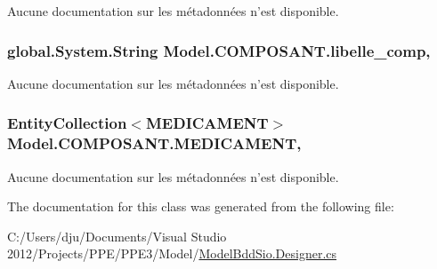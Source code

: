 Aucune documentation sur les métadonnées n'est disponible. 

\hypertarget{class_model_1_1_c_o_m_p_o_s_a_n_t_a238618dd950cff9c1d8cced54be482bb}{
\subsubsection[{libelle\-\_\-comp}]{\setlength{\rightskip}{0pt plus 5cm}global.\-System.\-String Model.\-C\-O\-M\-P\-O\-S\-A\-N\-T.\-libelle\-\_\-comp\hspace{0.3cm}{\ttfamily [get]}, {\ttfamily [set]}}}\label{class_model_1_1_c_o_m_p_o_s_a_n_t_a238618dd950cff9c1d8cced54be482bb}


Aucune documentation sur les métadonnées n'est disponible. 

\hypertarget{class_model_1_1_c_o_m_p_o_s_a_n_t_a84bbd2e702acaac88ac584599f8f26a1}{
\subsubsection[{M\-E\-D\-I\-C\-A\-M\-E\-N\-T}]{\setlength{\rightskip}{0pt plus 5cm}Entity\-Collection$<${\bf M\-E\-D\-I\-C\-A\-M\-E\-N\-T}$>$ Model.\-C\-O\-M\-P\-O\-S\-A\-N\-T.\-M\-E\-D\-I\-C\-A\-M\-E\-N\-T\hspace{0.3cm}{\ttfamily [get]}, {\ttfamily [set]}}}\label{class_model_1_1_c_o_m_p_o_s_a_n_t_a84bbd2e702acaac88ac584599f8f26a1}


Aucune documentation sur les métadonnées n'est disponible. 



The documentation for this class was generated from the following file\-:\begin{DoxyCompactItemize}
\item 
C\-:/\-Users/dju/\-Documents/\-Visual Studio 2012/\-Projects/\-P\-P\-E/\-P\-P\-E3/\-Model/\hyperlink{_model_bdd_sio_8_designer_8cs}{Model\-Bdd\-Sio.\-Designer.\-cs}\end{DoxyCompactItemize}

